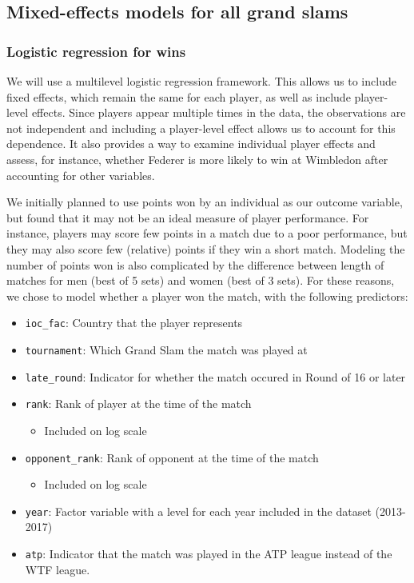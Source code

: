 \documentclass[]{article}
\providecommand{\tightlist}{%
  \setlength{\itemsep}{0pt}\setlength{\parskip}{0pt}}
\begin{document}
\hypertarget{mixed-effects-models-for-all-grand-slams}{%
\subsection{Mixed-effects models for all grand
slams}\label{mixed-effects-models-for-all-grand-slams}}

\hypertarget{logistic-regression-for-wins}{%
\subsubsection{Logistic regression for
wins}\label{logistic-regression-for-wins}}

We will use a multilevel logistic regression framework. This allows us
to include fixed effects, which remain the same for each player, as well
as include player-level effects. Since players appear multiple times in
the data, the observations are not independent and including a
player-level effect allows us to account for this dependence. It also
provides a way to examine individual player effects and assess, for
instance, whether Federer is more likely to win at Wimbledon after
accounting for other variables.

We initially planned to use points won by an individual as our outcome
variable, but found that it may not be an ideal measure of player
performance. For instance, players may score few points in a match due
to a poor performance, but they may also score few (relative) points if
they win a short match. Modeling the number of points won is also
complicated by the difference between length of matches for men (best of
5 sets) and women (best of 3 sets). For these reasons, we chose to model
whether a player won the match, with the following predictors:

\begin{itemize}
\tightlist
\item
  \texttt{ioc\_fac}: Country that the player represents
\item
  \texttt{tournament}: Which Grand Slam the match was played at
\item
  \texttt{late\_round}: Indicator for whether the match occured in Round
  of 16 or later
\item
  \texttt{rank}: Rank of player at the time of the match

  \begin{itemize}
  \tightlist
  \item
    Included on log scale
  \end{itemize}
\item
  \texttt{opponent\_rank}: Rank of opponent at the time of the match

  \begin{itemize}
  \tightlist
  \item
    Included on log scale
  \end{itemize}
\item
  \texttt{year}: Factor variable with a level for each year included in
  the dataset (2013-2017)
\item
  \texttt{atp}: Indicator that the match was played in the ATP league
  instead of the WTF league.
\end{itemize}
\end{document}
